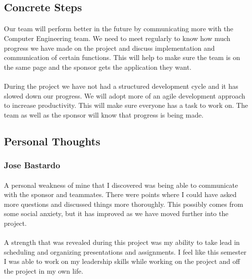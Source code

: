\documentclass[12pt, letterpaper]{article}
\begin{document}
    \subsection{Concrete Steps}
    \paragraph{}
    Our team will perform better in the future by communicating more with the Computer Engineering team. We 
    need to meet regularly to know how much progress we have made on the project and discuss 
    implementation and communication of certain functions. This will help to make sure the team 
    is on the same page and the sponsor gets the application they want.
    \paragraph{}
    During the project we have not had a structured development cycle and it has slowed down our 
    progress. We will adopt more of an agile development approach to increase productivity. 
    This will make sure everyone has a task to work on. The team as well as the sponsor will 
    know that progress is being made.
    \subsection{Personal Thoughts}
    \subsubsection{Jose Bastardo}
    \paragraph{}
    A personal weakness of mine that I discovered was being able to communicate with the sponsor 
    and teammates. There were points where I could have asked more questions and discussed 
    things more thoroughly. This possibly comes from some social anxiety, but it has improved 
    as we have moved further into the project.
    \paragraph{}
    A strength that was revealed during this project was my ability to take lead in scheduling 
    and organizing presentations and assignments. I feel like this semester I was able to work 
    on my leadership skills while working on the project and off the project in my own life.
\end{document}
